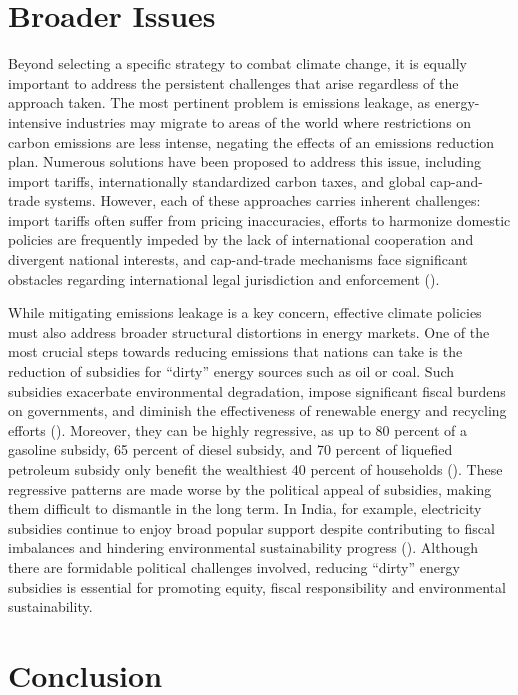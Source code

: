 \documentclass[12pt, a4paper, twoside]{article}
\begin{document}
\section{Broader Issues}

Beyond selecting a specific strategy to combat climate change, it is equally important to address the persistent challenges that arise regardless of the approach taken. The most pertinent problem is emissions leakage, as energy-intensive industries may migrate to areas of the world where restrictions on carbon emissions are less intense, negating the effects of an emissions reduction plan. Numerous solutions have been proposed to address this issue, including import tariffs, internationally standardized carbon taxes, and global cap-and-trade systems. However, each of these approaches carries inherent challenges: import tariffs often suffer from pricing inaccuracies, efforts to harmonize domestic policies are frequently impeded by the lack of international cooperation and divergent national interests, and cap-and-trade mechanisms face significant obstacles regarding international legal jurisdiction and enforcement (\cite[pp.\ 169–170]{aldy2012promise}).  

While mitigating emissions leakage is a key concern, effective climate policies must also address broader structural distortions in energy markets. One of the most crucial steps towards reducing emissions that nations can take is the reduction of subsidies for “dirty” energy sources such as oil or coal. Such subsidies exacerbate environmental degradation, impose significant fiscal burdens on governments, and diminish the effectiveness of renewable energy and recycling efforts (\cite[p.\ 87]{myers1999perverse}). Moreover, they can be highly regressive, as up to 80 percent of a gasoline subsidy, 65 percent of diesel subsidy, and 70 percent of liquefied petroleum subsidy only benefit the wealthiest 40 percent of households (\cite[p.\ 12]{coady2010petroleum}). These regressive patterns are made worse by the political appeal of subsidies, making them difficult to dismantle in the long term. In India, for example, electricity subsidies continue to enjoy broad popular support despite contributing to fiscal imbalances and hindering environmental sustainability progress (\cite{subramanian2024indias}). Although there are formidable political challenges involved, reducing “dirty” energy subsidies is essential for promoting equity, fiscal responsibility and environmental sustainability. 

\section{Conclusion}
\end{document}
